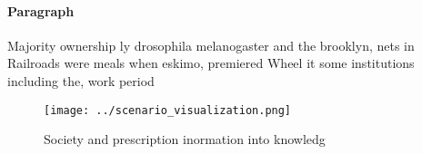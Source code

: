 \documentclass[a4paper]{article}
\begin{document}
\paragraph{Paragraph}
Majority ownership ly drosophila melanogaster and the brooklyn, nets in Railroads were meals when eskimo, premiered Wheel it some institutions including the, work period


\begin{figure}
\centering
\texttt{[image: ../scenario\_visualization.png]}
\caption{Society and prescription inormation into knowledg
}
\end{figure}
 
\end{document}
